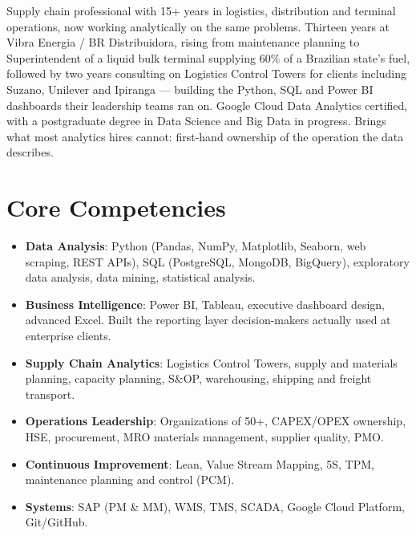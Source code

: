 \documentclass[11pt,a4paper,sans]{moderncv}
\begin{document}
\makecvtitle


\vspace{6pt}
\small{Supply chain professional with 15+ years in logistics, distribution and terminal operations, now working analytically on the same problems. Thirteen years at Vibra Energia / BR Distribuidora, rising from maintenance planning to Superintendent of a liquid bulk terminal supplying 60\% of a Brazilian state's fuel, followed by two years consulting on Logistics Control Towers for clients including Suzano, Unilever and Ipiranga --- building the Python, SQL and Power BI dashboards their leadership teams ran on. Google Cloud Data Analytics certified, with a postgraduate degree in Data Science and Big Data in progress. Brings what most analytics hires cannot: first-hand ownership of the operation the data describes.}


\section{Core Competencies}
\vspace{1pt}
\begin{itemize}

\item \textbf{Data Analysis}: Python (Pandas, NumPy, Matplotlib, Seaborn, web scraping, REST APIs), SQL (PostgreSQL, MongoDB, BigQuery), exploratory data analysis, data mining, statistical analysis.

\item \textbf{Business Intelligence}: Power BI, Tableau, executive dashboard design, advanced Excel. Built the reporting layer decision-makers actually used at enterprise clients.

\item \textbf{Supply Chain Analytics}: Logistics Control Towers, supply and materials planning, capacity planning, S\&OP, warehousing, shipping and freight transport.

\item \textbf{Operations Leadership}: Organizations of 50+, CAPEX/OPEX ownership, HSE, procurement, MRO materials management, supplier quality, PMO.

\item \textbf{Continuous Improvement}: Lean, Value Stream Mapping, 5S, TPM, maintenance planning and control (PCM).

\item \textbf{Systems}: SAP (PM \& MM), WMS, TMS, SCADA, Google Cloud Platform, Git/GitHub.

\end{itemize}
\end{document}

